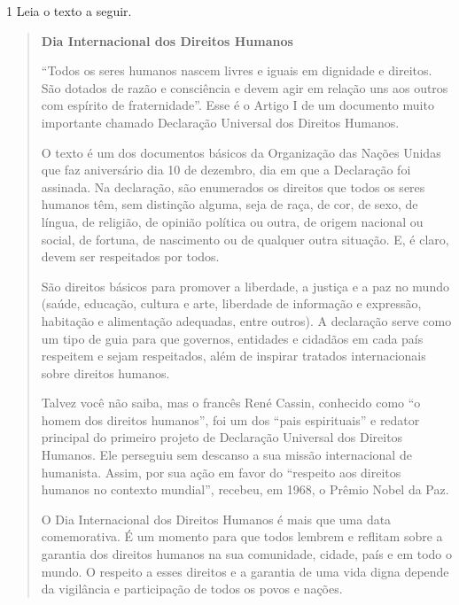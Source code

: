 \begin{escolha}
\begin{escolha}
\begin{escolha}
{{

\num{1} Leia o texto a seguir.


\begin{quote}
\textbf{Dia Internacional dos Direitos Humanos}


``Todos os seres humanos nascem livres e iguais em dignidade e
direitos. São dotados de razão e consciência e devem agir em relação
uns aos outros com espírito de fraternidade''. Esse é o Artigo I de um
documento muito importante chamado Declaração Universal dos Direitos
Humanos.

O texto é um dos documentos básicos da Organização das Nações Unidas que
faz aniversário dia 10 de dezembro, dia em que a Declaração foi
assinada. Na declaração, são enumerados os direitos que todos os seres
humanos têm, sem distinção alguma, seja de raça, de cor, de sexo, de
língua, de religião, de opinião política ou outra, de origem nacional ou
social, de fortuna, de nascimento ou de qualquer outra situação. E, é
claro, devem ser respeitados por todos.

São direitos básicos para promover a liberdade, a justiça e a paz no
mundo (saúde, educação, cultura e arte, liberdade de informação e
expressão, habitação e alimentação adequadas, entre outros). A
declaração serve como um tipo de guia para que governos, entidades e
cidadãos em cada país respeitem e sejam respeitados, além de inspirar
tratados internacionais sobre direitos humanos.

Talvez você não saiba, mas o francês René Cassin, conhecido como ``o
homem dos direitos humanos'', foi um dos ``pais espirituais'' e redator
principal do primeiro projeto de Declaração Universal dos Direitos
Humanos. Ele perseguiu sem descanso a sua missão internacional de
humanista. Assim, por sua ação em favor do ``respeito aos direitos
humanos no contexto mundial'', recebeu, em 1968, o Prêmio Nobel da Paz.

O Dia Internacional dos Direitos Humanos é mais que uma data
comemorativa. É um momento para que todos lembrem e reflitam sobre a
garantia dos direitos humanos na sua comunidade, cidade, país e em todo
o mundo. O respeito a esses direitos e a garantia de uma vida digna
depende da vigilância e participação de todos os povos e nações.


\end{quote}}}
\end{escolha}
\end{escolha}
\end{escolha}
